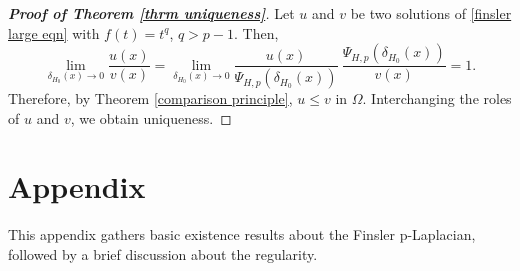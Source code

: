 \documentclass[11pt]{amsart}
\numberwithin{equation}{section}
\begin{document}
   \begin{proof}[\textbf{Proof of Theorem \ref{thrm uniqueness}}]
       Let $u$ and $v$ be two solutions of \eqref{finsler large eqn} with $f(t)=t^{q}$, $q>p-1$. Then, 
    \begin{equation*}
        \lim_{\delta_{H_{0}}(x)\to 0}\frac{u(x)}{v(x)}=\lim_{\delta_{H_{0}}(x)\to 0}\frac{u(x)}{\Psi_{H,p}(\delta_{H_{0}}(x))}~\frac{\Psi_{H,p}(\delta_{H_{0}}(x))}{v(x)}=1.
    \end{equation*}
    Therefore, by Theorem \ref{comparison principle}, $u\leq v$ in $\Omega$. Interchanging the roles of $u$ and $v$, we obtain uniqueness.
   \end{proof} 
    
    \section{Appendix}
This appendix gathers basic existence results about the Finsler p-Laplacian, followed by a brief discussion about the regularity.
\end{document}
